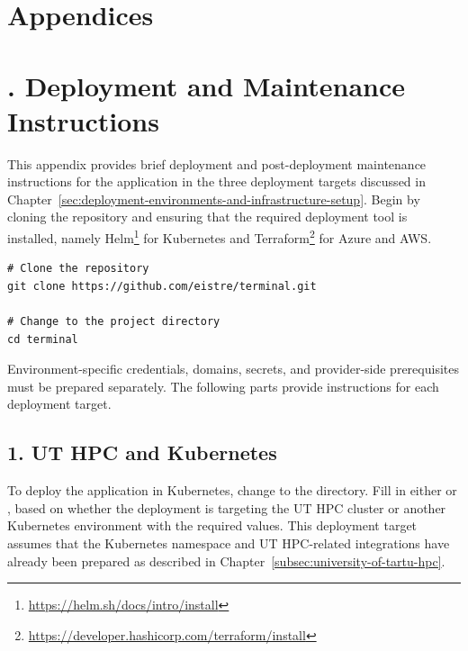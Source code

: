 

\section*{Appendices} \label{sec:appendices} 

\appendix
{}


\section*{\thesection. Deployment and Maintenance Instructions} \label{app:deployment-and-maintenance-instructions}
This appendix provides brief deployment and post-deployment maintenance instructions for the application in the three deployment targets discussed in Chapter~\ref{sec:deployment-environments-and-infrastructure-setup}.
Begin by cloning the repository and ensuring that the required deployment tool is installed, namely Helm\footnote{\url{https://helm.sh/docs/intro/install}} for Kubernetes and Terraform\footnote{\url{https://developer.hashicorp.com/terraform/install}} for Azure and AWS\@.

\begin{verbatim}
# Clone the repository
git clone https://github.com/eistre/terminal.git

# Change to the project directory
cd terminal
\end{verbatim}

Environment-specific credentials, domains, secrets, and provider-side prerequisites must be prepared separately.
The following parts provide instructions for each deployment target.

\subsection*{1. UT HPC and Kubernetes}
To deploy the application in Kubernetes, change to the  directory.
Fill in either  or , based on whether the deployment is targeting the UT HPC cluster or another Kubernetes environment with the required values.
This deployment target assumes that the Kubernetes namespace and UT HPC-related integrations have already been prepared as described in Chapter~\ref{subsec:university-of-tartu-hpc}.

